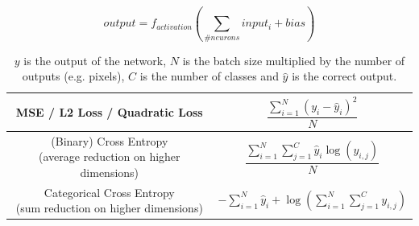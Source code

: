 \begin{equation}
    \label{eq:fully_connected}
    output = f_{activation}\left(\displaystyle\sum_{\#neurons} input_i + bias\right)
\end{equation}

\begin{table}
    \centering
    \begin{adjustbox}{width={0.9\textwidth},totalheight={\textheight},keepaspectratio} %
    \setcellgapes{3pt}
    \makegapedcells
    \begin{tabular}{|c|c|}
    \hline
    MSE / L2 Loss / Quadratic Loss & $\dfrac{\sum_{i=1}^{N} \left(y_i - \hat{y}_i\right)^2}{N}$ \\ \hline
    \makecell{(Binary) Cross Entropy \\ (average reduction on higher dimensions)} & $\dfrac{\sum_{i=1}^{N} \sum_{j=1}^{C} \hat{y}_i \log\left(y_{i,j}\right)}{N}$ \\ \hline
    \makecell{Categorical Cross Entropy \\ (sum reduction on higher dimensions)} & $- \sum_{i=1}^{N} \hat{y}_i +  \log\left(\sum_{i=1}^{N} \sum_{j=1}^{C} y_{i,j}\right)$ \\ \hline
    \end{tabular}
    \end{adjustbox} %
    \caption{$y$ is the output of the network, $N$ is the batch size multiplied by the number of outputs (e.g. pixels), $C$ is the number of classes and $\hat{y}$ is the correct output.}
    \label{tab:loss_functions}
\end{table}


